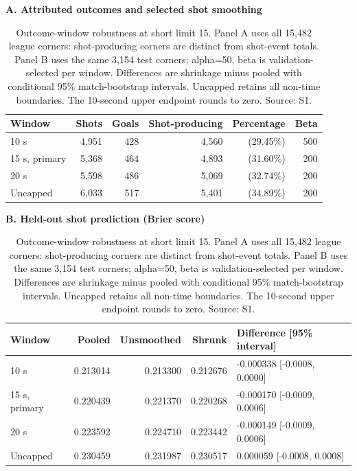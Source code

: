 \begin{table}[tbp]
\caption{Outcome-window robustness at short limit 15. Panel A uses all 15,482 league corners: shot-producing corners are distinct from shot-event totals. Panel B uses the same 3,154 test corners; alpha=50, beta is validation-selected per window. Differences are shrinkage minus pooled with conditional 95\% match-bootstrap intervals. Uncapped retains all non-time boundaries. The 10-second upper endpoint rounds to zero. Source: S1.}
\label{tab:window-sensitivity}
\centering\normalsize
\setlength{\tabcolsep}{4pt}
\textbf{A. Attributed outcomes and selected shot smoothing}
\par\smallskip
\begin{tabular}{@{}lrrrrr@{}}
\toprule
Window & Shots & Goals & Shot-producing & Percentage & Beta \\
\midrule
10 s & 4,951 & 428 & 4,560 & (29.45\%) & 500 \\
15 s, primary & 5,368 & 464 & 4,893 & (31.60\%) & 200 \\
20 s & 5,598 & 486 & 5,069 & (32.74\%) & 200 \\
Uncapped & 6,033 & 517 & 5,401 & (34.89\%) & 200 \\
\bottomrule
\end{tabular}
\par\medskip
\textbf{B. Held-out shot prediction (Brier score)}
\par\smallskip
\begin{tabular}{@{}lrrrl@{}}
\toprule
Window & Pooled & Unsmoothed & Shrunk & Difference [95\% interval] \\
\midrule
10 s & 0.213014 & 0.213300 & 0.212676 & -0.000338 [-0.0008, 0.0000] \\
15 s, primary & 0.220439 & 0.221370 & 0.220268 & -0.000170 [-0.0009, 0.0006] \\
20 s & 0.223592 & 0.224710 & 0.223442 & -0.000149 [-0.0009, 0.0006] \\
Uncapped & 0.230459 & 0.231987 & 0.230517 & 0.000059 [-0.0008, 0.0008] \\
\bottomrule
\end{tabular}
\end{table}
